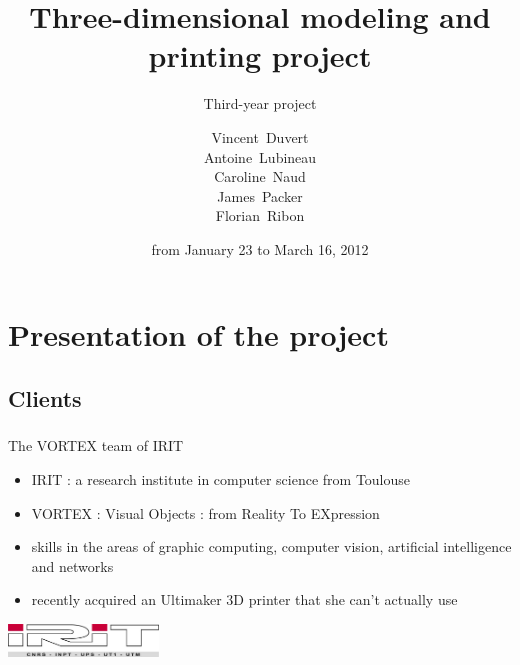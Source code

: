 \documentclass{beamer}
\title{Three-dimensional modeling and printing project}
\subtitle{Third-year project}
\author[V. Duvert, A. Lubineau, C. Naud, J. Packer, F. Ribon]{\scriptsize
Vincent~Duvert \\ Antoine~Lubineau \\ Caroline~Naud \\ James~Packer \\ Florian~Ribon}
\date{from January 23 to March 16, 2012}
\begin{document}
\frame{\titlepage}

\section{Presentation of the project}

\subsection{Clients}
\begin{frame}
	\frametitle{}
	
	\begin{block}{The \textsc{VORTEX} team of IRIT}
		\begin{itemize}
		\item \textsc{IRIT} : a research institute in computer science from Toulouse
		\item \textsc{VORTEX} : Visual Objects : from Reality To EXpression
		\item skills in the areas of graphic computing,  computer vision, artificial intelligence and networks
		\item recently acquired an Ultimaker 3D printer that she can't actually use
		\end{itemize}
    \end{block}
    
    \begin{center}
		\includegraphics[width=4cm]{irit}
	\end{center}
    
\end{frame}
\end{document}
